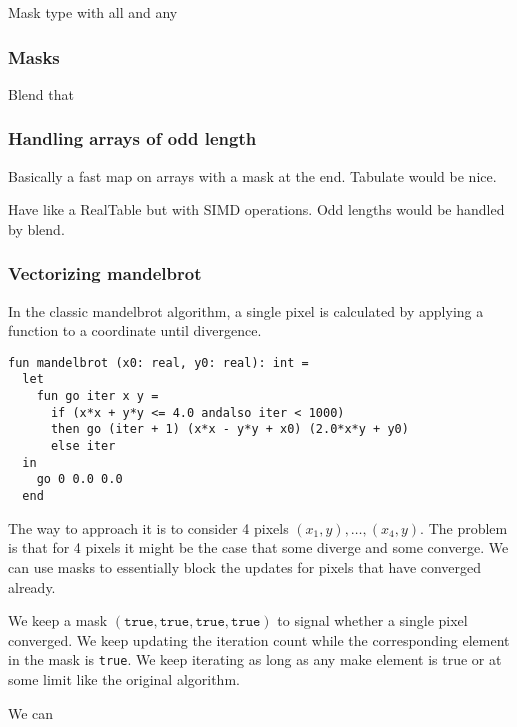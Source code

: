 \documentclass{article}
\begin{document}
Mask type with all and any

\subsubsection{Masks}

Blend that 

\subsubsection{Handling arrays of odd length}


Basically a fast map on arrays with a mask at the end.
Tabulate would be nice.

Have like a RealTable but with SIMD operations. Odd lengths would be handled by blend.

\subsubsection{Vectorizing mandelbrot}

In the classic mandelbrot algorithm, a single pixel is calculated by applying a function to a coordinate until divergence.

\begin{lstlisting}
fun mandelbrot (x0: real, y0: real): int =
  let
    fun go iter x y =
      if (x*x + y*y <= 4.0 andalso iter < 1000)
      then go (iter + 1) (x*x - y*y + x0) (2.0*x*y + y0)
      else iter
  in
    go 0 0.0 0.0
  end
\end{lstlisting}

The way to approach it is to consider 4 pixels $(x_1, y), \ldots, (x_4, y)$. The problem is that for 4 pixels it might be the case that some diverge and some converge. We can use masks to essentially block the updates for pixels that have converged already.

We keep a mask $(\texttt{true}, \texttt{true}, \texttt{true}, \texttt{true})$ to signal whether a single pixel converged. We keep updating the iteration count while the corresponding element in the mask is \texttt{true}. We keep iterating as long as any make element is true or at some limit like the original algorithm.

We can 
\end{document}
